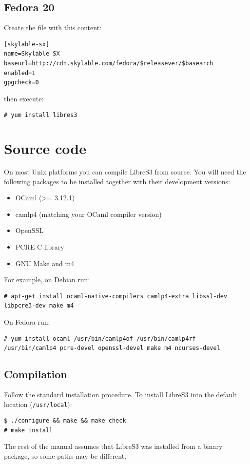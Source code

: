 \subsection{Fedora 20}
Create the file  with this content:
\begin{lstlisting}
[skylable-sx]
name=Skylable SX
baseurl=http://cdn.skylable.com/fedora/$releasever/$basearch
enabled=1
gpgcheck=0
\end{lstlisting}
then execute:
\begin{lstlisting}
# yum install libres3
\end{lstlisting}

\section{Source code}

On most Unix platforms you can compile LibreS3
from source. You will need the following packages to be installed together with their
development versions:
\begin{itemize}
    \item OCaml (>= 3.12.1)
    \item camlp4 (matching your OCaml compiler version)
    \item OpenSSL
    \item PCRE C library
    \item GNU Make and m4
\end{itemize}
For example, on Debian run:

\begin{lstlisting}
# apt-get install ocaml-native-compilers camlp4-extra libssl-dev libpcre3-dev make m4
\end{lstlisting}

On Fedora run:

\begin{lstlisting}
# yum install ocaml /usr/bin/camlp4of /usr/bin/camlp4rf /usr/bin/camlp4 pcre-devel openssl-devel make m4 ncurses-devel
\end{lstlisting}


\newpage
\subsection{Compilation}

Follow the standard installation procedure. To install
LibreS3 into the default location (\verb+/usr/local+):

\begin{lstlisting}
$ ./configure && make && make check
# make install
\end{lstlisting}
The rest of the manual assumes that LibreS3 was installed from a binary
package, so some paths may be different.

